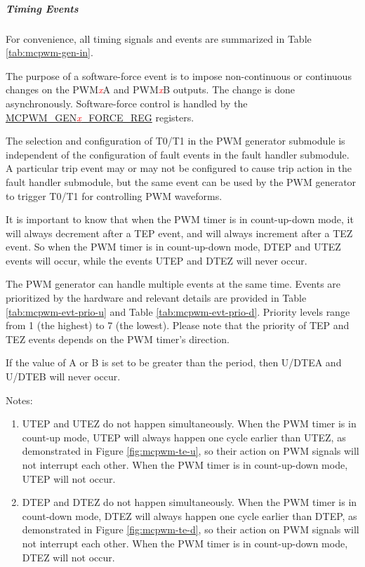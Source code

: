 \documentclass[main\_\_EN.tex]{subfiles}
\begin{document}
\subparagraph{Timing Events}
For convenience, all timing signals and events are summarized in Table \ref{tab:mcpwm-gen-in}.


The purpose of a software-force event is to impose non-continuous or continuous changes on the PWM\textcolor{red}{\it{x}}A and PWM\textcolor{red}{\it{x}}B outputs. The change is done asynchronously. Software-force control is handled by the\\ \hyperref[regdesc:MCPWMGEN0FORCEREG]{MCPWM\_GEN\textcolor{red}{\it{x}}\_FORCE\_REG} registers.

The selection and configuration of T0/T1 in the PWM generator submodule is independent of the configuration of fault events in the fault handler submodule. A particular trip event may or may not be configured to cause trip action in the fault handler submodule, but the same event can be used by the PWM generator to trigger T0/T1 for controlling PWM waveforms.

It is important to know that when the PWM timer is in count-up-down mode, it will always decrement after a TEP event, and will always increment after a TEZ event. So when the PWM timer is in count-up-down mode, DTEP and UTEZ events will occur, while the events UTEP and DTEZ will never occur.

The PWM generator can handle multiple events at the same time. Events are prioritized by the hardware and relevant details are provided in Table \ref{tab:mcpwm-evt-prio-u} and Table \ref{tab:mcpwm-evt-prio-d}. Priority levels range from 1 (the highest) to 7 (the lowest). Please note that the priority of TEP and TEZ events depends on the PWM timer's direction.

If the value of A or B is set to be greater than the period, then U/DTEA and U/DTEB will never occur.




Notes:
\begin{enumerate}
   \item UTEP and UTEZ do not happen simultaneously. When the PWM timer is in count-up mode, UTEP will always happen one cycle earlier than UTEZ, as demonstrated in Figure \ref{fig:mcpwm-te-u}, so their action on PWM signals will not interrupt each other. When the PWM timer is in count-up-down mode, UTEP will not occur.
    \item DTEP and DTEZ do not happen simultaneously. When the PWM timer is in count-down mode, DTEZ will always happen one cycle earlier than DTEP, as demonstrated in Figure \ref{fig:mcpwm-te-d}, so their action on PWM signals will not interrupt each other. When the PWM timer is in count-up-down mode, DTEZ will not occur.
\end{enumerate}
\end{document}
